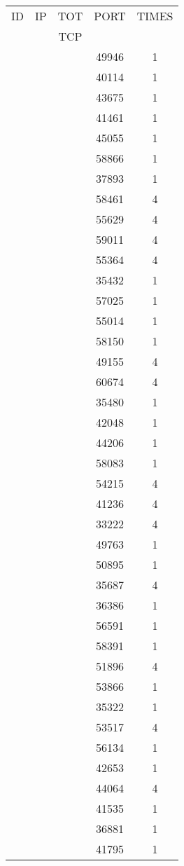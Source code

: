 \documentclass[a4paper]{scrartcl}
\begin{document}
\begin{minipage}[b]{0.5\linewidth}
\begin{tabular}{| c | c | c | c | c |}
\hline
ID & IP & TOT & PORT & TIMES \\ 
   &    & TCP &      &       \\ 
\hline
& & & 49946 & 1 \\ & & & 40114 & 1 \\ & & & 43675 & 1 \\ & & & 41461 & 1 \\ & & & 45055 & 1 \\ & & & 58866 & 1 \\ & & & 37893 & 1 \\ & & & 58461 & 4 \\ & & & 55629 & 4 \\ & & & 59011 & 4 \\ & & & 55364 & 4 \\ & & & 35432 & 1 \\ & & & 57025 & 1 \\ & & & 55014 & 1 \\ & & & 58150 & 1 \\ & & & 49155 & 4 \\ & & & 60674 & 4 \\ & & & 35480 & 1 \\ & & & 42048 & 1 \\ & & & 44206 & 1 \\ & & & 58083 & 1 \\ & & & 54215 & 4 \\ & & & 41236 & 4 \\ & & & 33222 & 4 \\ & & & 49763 & 1 \\ & & & 50895 & 1 \\ & & & 35687 & 4 \\ & & & 36386 & 1 \\ & & & 56591 & 1 \\ & & & 58391 & 1 \\ & & & 51896 & 4 \\ & & & 53866 & 1 \\ & & & 35322 & 1 \\ & & & 53517 & 4 \\ & & & 56134 & 1 \\ & & & 42653 & 1 \\ & & & 44064 & 4 \\ & & & 41535 & 1 \\ & & & 36881 & 1 \\ & & & 41795 & 1 \\ \hline\end{tabular}\end{minipage} \hfill\begin{minipage}[b]{0.5\linewidth}\begin{tabular}{| c | c | c | c | c |}

\end{tabular}
\end{minipage}
\end{document}
